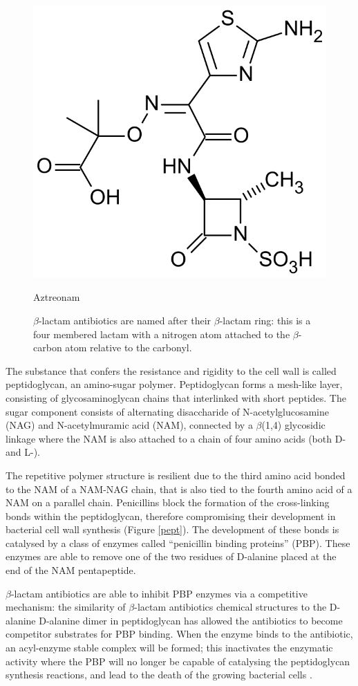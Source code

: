 \documentclass[11pt]{report}
\begin{document}
\begin{figure}[ht]
  \noindent\begin{minipage}[b]{0.5\linewidth}
    \includegraphics[width=.5\linewidth]{img/aztreonam.png} 
    \caption*{Aztreonam} 
  \end{minipage}%
  \caption{$\beta$-lactam antibiotics are named after their $\beta$-lactam ring: this is a four membered lactam with a nitrogen atom attached to the $\beta$-carbon atom relative to the carbonyl.}
 \label{beta_lact}
\end{figure}


The substance that confers the resistance and rigidity to the cell wall is called peptidoglycan, an amino-sugar polymer.
Peptidoglycan forms a mesh-like layer, consisting of glycosaminoglycan chains that interlinked with short peptides.
The sugar component consists of alternating disaccharide of N-acetylglucosamine (NAG) and N-acetylmuramic acid (NAM), connected by a $\beta$(1,4) glycosidic linkage where the NAM is also attached to a chain of four amino acids (both D- and L-).

The repetitive polymer structure is resilient due to the third amino acid bonded to the NAM of a NAM-NAG chain, that is also tied to the fourth amino acid of a NAM on a parallel chain.
Penicillins block the formation of the cross-linking bonds within the peptidoglycan, therefore compromising their development in bacterial cell wall synthesis (Figure \ref{pept}).
The development of these bonds is catalysed by a class of enzymes called “penicillin binding proteins” (PBP).
These enzymes are able to remove one of the two residues of D-alanine placed at the end of the NAM pentapeptide.

$\beta$-lactam antibiotics are able to inhibit PBP enzymes via a competitive mechanism: the similarity of $\beta$-lactam antibiotics chemical structures to the D-alanine D-alanine dimer in peptidoglycan has allowed the antibiotics to become competitor substrates for PBP binding.
When the enzyme binds to the antibiotic, an acyl-enzyme stable complex will be formed; this inactivates the enzymatic activity where the PBP will no longer be capable of catalysing the peptidoglycan synthesis reactions, and lead to the death of the growing bacterial cells \cite{kong2010beta}.
\end{document}
